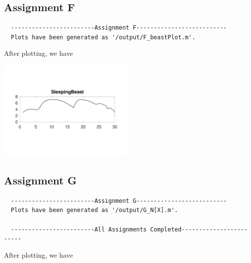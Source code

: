 \documentclass{article}
\begin{document}
\subsection{\textbf{Assignment F}}
\lstset{language=C++}
\begin{lstlisting}
  ------------------------Assignment F--------------------------
  Plots have been generated as '/output/F_beastPlot.m'.
\end{lstlisting}
After plotting, we have

\includegraphics[width=0.5\textwidth]{figures/Assignment_F_beastPlot.png}


\subsection{\textbf{Assignment G}}
\lstset{language=C++}
\begin{lstlisting}
  ------------------------Assignment G--------------------------
  Plots have been generated as '/output/G_N[X].m'.
  
  ------------------------All Assignments Completed------------------------
\end{lstlisting}
After plotting, we have
\end{document}
